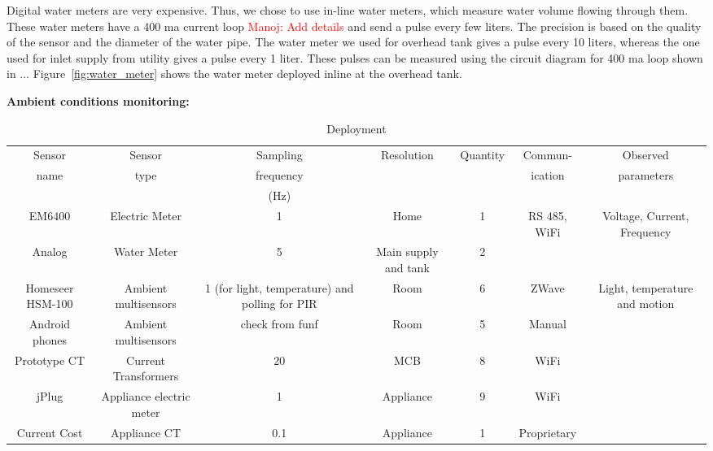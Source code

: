 \documentclass[10pt]{sensys-proc}
\newcommand{\redcolor}[1]{\textcolor{red}{#1}}
\newcommand{\figref}[1]{Figure~\ref{#1}}
\begin{document}
\noindent Digital water meters are very expensive. Thus, we chose to use in-line water meters, which measure water volume flowing through them. These water meters have a 400 ma current loop \redcolor{Manoj: Add details} and send a pulse every few liters. The precision is based on the quality of the sensor and the diameter of the water pipe. The water meter we used for overhead tank gives a pulse every 10 liters, whereas the one used for inlet supply from utility gives a pulse every 1 liter. These pulses can be measured using the circuit diagram for 400 ma loop shown in ... \figref{fig:water_meter} shows the water meter deployed inline at the overhead tank.

\noindent \textbf{Ambient conditions monitoring:} 




\begin{table}
\caption{Deployment}

\label{tab:sensing}
\tabcolsep=0.02cm
\begin{tabular}{|c|c|c|c|c|c|c|}
\hline
Sensor&Sensor&Sampling&Resolution&Quantity&Commun-&Observed\\
name&type&frequency&&&ication&parameters\\
&&(Hz)&&&&\\
\hline

EM6400&Electric Meter&1&Home&1&RS 485, WiFi&Voltage, Current, Frequency\\
Analog&Water Meter&5&Main supply and tank&2&\\
Homeseer HSM-100&Ambient multisensors&1 (for light, temperature) and polling for PIR&Room &6&ZWave&Light, temperature and motion\\
Android phones&Ambient multisensors& check from funf&Room&5&Manual\\
Prototype CT&Current Transformers&20&MCB&8&WiFi\\
jPlug&Appliance electric meter & 1 &Appliance&9&WiFi\\
Current Cost&Appliance CT&0.1&Appliance&1&Proprietary\\
\hline

\end{tabular}


\end{table}
\end{document}
